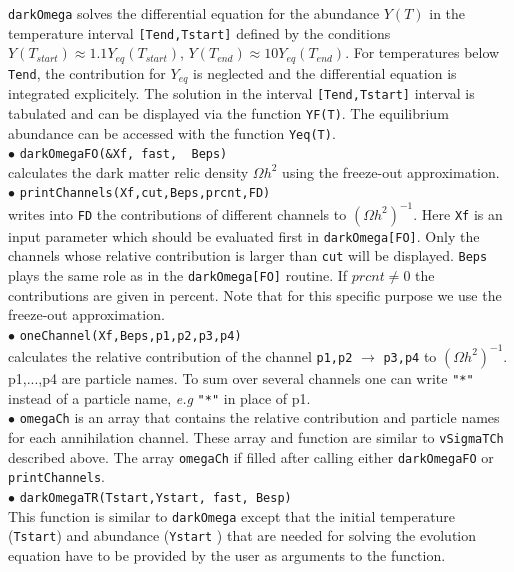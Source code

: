 \documentclass[12pt,a4paper]{article}
\begin{document}
   
\verb|darkOmega| solves the differential equation for the abundance $Y(T)$   in the 
temperature interval {\tt [Tend,Tstart]}  defined by the
conditions $Y(T_{start})\approx 1.1Y_{eq}(T_{start})$,
$Y(T_{end})\approx10Y_{eq}(T_{end})$.  For temperatures below {\tt Tend}, the contribution for  $Y_{eq}$
 is neglected and  the differential equation is integrated
explicitely. The solution in the interval {\tt [Tend,Tstart]}  interval is tabulated and can be displayed  via the
function {\tt YF(T)}. The equilibrium abundance can be accessed  with the function
{\tt Yeq(T)}. \\

\noindent
$\bullet$ \verb|darkOmegaFO(&Xf, fast,  Beps)|\\
calculates the  dark matter relic density $\Omega h^2$ using the freeze-out approximation.\\

\noindent
$\bullet$ \verb|printChannels(Xf,cut,Beps,prcnt,FD)|\\   
writes into \verb|FD| the  contributions  of different channels to $(\Omega
h^2)^{-1}$. Here \verb|Xf| is an input parameter which should
be  evaluated first in \verb|darkOmega[FO]|. Only  the channels whose
relative contribution is larger than  \verb|cut| will be displayed. \verb|Beps|
plays the same role as in the \verb|darkOmega[FO]| routine.
If $prcnt\ne 0$ the contributions are given in percent.
Note that  for this specific purpose  we use the
freeze-out approximation.\\

\noindent
$\bullet$ \verb|oneChannel(Xf,Beps,p1,p2,p3,p4)|\\   
calculates the relative   contribution of the  channel \verb|p1,p2| $\to$ \verb|p3,p4|
to $(\Omega h^2)^{-1}$. p1,...,p4 are particle names.  To 
sum over several channels one can write  \verb|"*"| instead 
of  a particle name, {\it e.g} \verb|"*"| in place of p1.\\

\noindent
$\bullet$ \verb|omegaCh| is an array that contains the relative contribution and particle names for each
annihilation channel. These array and function
are similar to {\tt vSigmaTCh} described above. The array {\tt omegaCh} if filled after calling either
{\tt darkOmegaFO} or {\tt printChannels}. \\

\noindent
$\bullet$ \verb|darkOmegaTR(Tstart,Ystart, fast, Besp)|\\
This function is similar to  \verb|darkOmega| except that the  initial  temperature (\verb|Tstart|) and abundance (\verb|Ystart| ) that are needed for solving the  evolution equation have to be provided by   the user as arguments to the function.
\end{document}
